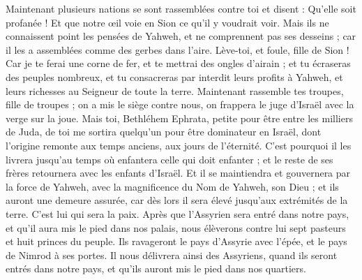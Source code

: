 \begin{multicols}{2}
Maintenant plusieurs nations se sont rassemblées contre toi et disent : Qu'elle soit profanée ! Et que notre œil voie en Sion ce qu'il y voudrait voir.
Mais ils ne connaissent point les pensées de Yahweh, et ne comprennent pas ses desseins ; car il les a assemblées comme des gerbes dans l'aire.
Lève-toi, et foule, fille de Sion ! Car je te ferai une corne de fer, et te mettrai des ongles d'airain ; et tu écraseras des peuples nombreux, et tu consacreras par interdit leurs profits à Yahweh, et leurs richesses au Seigneur de toute la terre.
Maintenant rassemble tes troupes, fille de troupes ; on a mis le siège contre nous, on frappera le juge d'Israël avec la verge sur la joue.
\VerseOne{}Mais toi, Bethléhem Ephrata, petite pour être entre les milliers de Juda, de toi me sortira quelqu'un pour être dominateur en Israël, dont l'origine remonte aux temps anciens, aux jours de l'éternité.
C'est pourquoi il les livrera jusqu'au temps où enfantera celle qui doit enfanter ; et le reste de ses frères retournera avec les enfants d'Israël.
Et il se maintiendra et gouvernera par la force de Yahweh, avec la magnificence du Nom de Yahweh, son Dieu ; et ils auront une demeure assurée, car dès lors il sera élevé jusqu'aux extrémités de la terre.
C'est lui qui sera la paix. Après que l'Assyrien sera entré dans notre pays, et qu'il aura mis le pied dans nos palais, nous élèverons contre lui sept pasteurs et huit princes du peuple.
Ils ravageront le pays d'Assyrie avec l'épée, et le pays de Nimrod à ses portes. Il nous délivrera ainsi des Assyriens, quand ils seront entrés dans notre pays, et qu'ils auront mis le pied dans nos quartiers.

\end{multicols}

